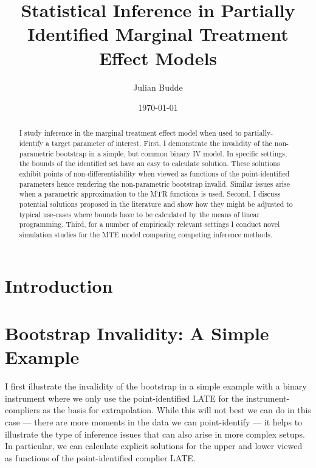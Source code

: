 \documentclass[12pt,a4paper,english]{article} %
\title{Statistical Inference in Partially Identified Marginal Treatment Effect Models}
\author{Julian Budde}
\date{\today}
\numberwithin{equation}{section}
\theoremstyle{definition}
\theoremstyle{remark}
\theoremstyle{plain}
\begin{document}
\maketitle

\begin{abstract}
	I study inference in the marginal treatment effect model when used to partially-identify a target parameter of interest.
	First, I demonstrate the invalidity of the non-parametric bootstrap in a simple, but common binary IV model.
	In specific settings, the bounds of the identified set have an easy to calculate solution.
	These solutions exhibit points of non-differentiability when viewed as functions of the point-identified parameters hence rendering the non-parametric bootstrap invalid.
	Similar issues arise when a parametric approximation to the MTR functions is used.
  Second, I discuss potential solutions proposed in the literature and show how they might be adjusted to typical use-cases where bounds have to be calculated by the means of linear programming.
	Third, for a number of empirically relevant settings I conduct novel simulation studies for the MTE model comparing competing inference methods.
\end{abstract}

\clearpage
\newpage

\tableofcontents

\clearpage
\newpage

\listoftables

\clearpage
\newpage

\listoffigures

\clearpage
\newpage

\section{Introduction}\label{sec:introduction}

\section{Bootstrap Invalidity: A Simple Example}\label{sec:simple_example}
I first illustrate the invalidity of the bootstrap in a simple example with a binary instrument where we only use the point-identified LATE for the instrument-compliers as the basis for extrapolation.
While this will not best we can do in this case --- there are more moments in the data we can point-identify --- it helps to illustrate the type of inference issues that can also arise in more complex setups.
In particular, we can calculate explicit solutions for the upper and lower viewed as functions of the point-identified complier LATE.\@
\end{document}
